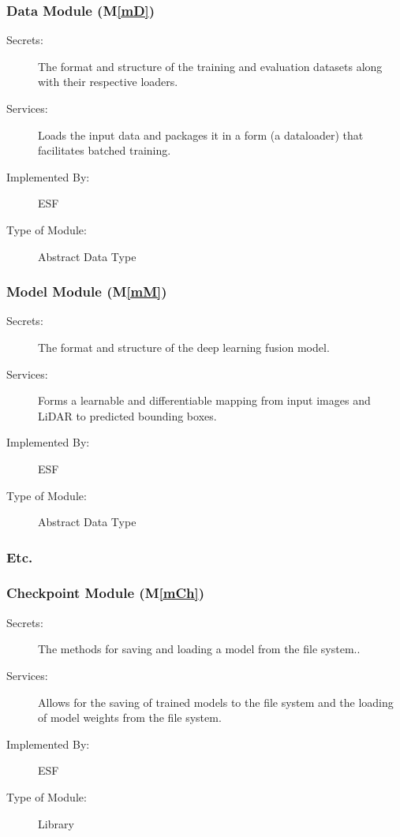 \documentclass[12pt, titlepage]{article}
\newcommand{\ProjectName}{ESF }
\newcommand{\mref}[1]{M\ref{#1}}
\begin{document}
\subsubsection{Data Module (\mref{mD})}
\begin{description}
\item[Secrets:] The format and structure of the training and evaluation datasets along with their respective loaders.
\item[Services:] Loads the input data and packages it in a form (a dataloader) that facilitates batched training.
\item[Implemented By:] \ProjectName{}
\item[Type of Module:] Abstract Data Type
\end{description}

\subsubsection{Model Module (\mref{mM})}
\begin{description}
\item[Secrets:] The format and structure of the deep learning fusion model.
\item[Services:] Forms a learnable and differentiable mapping from input images and LiDAR to predicted bounding boxes.
\item[Implemented By:] \ProjectName{}
\item[Type of Module:] Abstract Data Type
\end{description}
\subsubsection{Etc.}

\subsubsection{Checkpoint Module (\mref{mCh})}
\begin{description}
\item[Secrets:] The methods for saving and loading a model from the file system..
\item[Services:] Allows for the saving of trained models to the file system and the loading of model weights from the file system.
\item[Implemented By:] \ProjectName{}
\item[Type of Module:] Library
\end{description}
\end{document}
